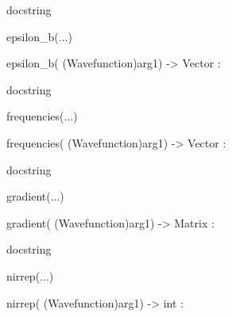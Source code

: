 \documentclass[letterpaper,10pt,english]{sphinxmanual}
\begin{document}
\begin{description}
\begin{description}
\begin{DUlineblock}{0em}
\begin{DUlineblock}{\DUlineblockindent}
\begin{DUlineblock}{\DUlineblockindent}
\item[] docstring
\item[] 
\end{DUlineblock}
\end{DUlineblock}
\item[] epsilon\_b(...)
\item[]
\begin{DUlineblock}{\DUlineblockindent}
\item[] epsilon\_b( (Wavefunction)arg1) -\textgreater{} Vector :
\item[]
\begin{DUlineblock}{\DUlineblockindent}
\item[] docstring
\item[] 
\end{DUlineblock}
\end{DUlineblock}
\item[] frequencies(...)
\item[]
\begin{DUlineblock}{\DUlineblockindent}
\item[] frequencies( (Wavefunction)arg1) -\textgreater{} Vector :
\item[]
\begin{DUlineblock}{\DUlineblockindent}
\item[] docstring
\item[] 
\end{DUlineblock}
\end{DUlineblock}
\item[] gradient(...)
\item[]
\begin{DUlineblock}{\DUlineblockindent}
\item[] gradient( (Wavefunction)arg1) -\textgreater{} Matrix :
\item[]
\begin{DUlineblock}{\DUlineblockindent}
\item[] docstring
\item[] 
\end{DUlineblock}
\end{DUlineblock}
\item[] nirrep(...)
\item[]
\begin{DUlineblock}{\DUlineblockindent}
\item[] nirrep( (Wavefunction)arg1) -\textgreater{} int :
\item[]
\begin{DUlineblock}{\DUlineblockindent}

\end{DUlineblock}
\end{DUlineblock}
\end{DUlineblock}
\end{description}
\end{description}
\end{document}

